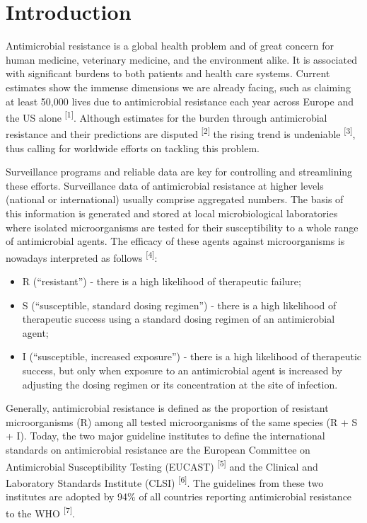 \documentclass[
]{book}
\providecommand{\tightlist}{%
  \setlength{\itemsep}{0pt}\setlength{\parskip}{0pt}}
\begin{document}
\hypertarget{introduction-1}{%
\section{Introduction}\label{introduction-1}}

Antimicrobial resistance is a global health problem and of great concern for human medicine, veterinary medicine, and the environment alike. It is associated with significant burdens to both patients and health care systems. Current estimates show the immense dimensions we are already facing, such as claiming at least 50,000 lives due to antimicrobial resistance each year across Europe and the US alone \textsuperscript{{[}1{]}}. Although estimates for the burden through antimicrobial resistance and their predictions are disputed \textsuperscript{{[}2{]}} the rising trend is undeniable \textsuperscript{{[}3{]}}, thus calling for worldwide efforts on tackling this problem.

Surveillance programs and reliable data are key for controlling and streamlining these efforts. Surveillance data of antimicrobial resistance at higher levels (national or international) usually comprise aggregated numbers. The basis of this information is generated and stored at local microbiological laboratories where isolated microorganisms are tested for their susceptibility to a whole range of antimicrobial agents. The efficacy of these agents against microorganisms is nowadays interpreted as follows \textsuperscript{{[}4{]}}:

\begin{itemize}
\tightlist
\item
  R (``resistant'') - there is a high likelihood of therapeutic failure;
\item
  S (``susceptible, standard dosing regimen'') - there is a high likelihood of therapeutic success using a standard dosing regimen of an antimicrobial agent;
\item
  I (``susceptible, increased exposure'') - there is a high likelihood of therapeutic success, but only when exposure to an antimicrobial agent is increased by adjusting the dosing regimen or its concentration at the site of infection.
\end{itemize}

Generally, antimicrobial resistance is defined as the proportion of resistant microorganisms (R) among all tested microorganisms of the same species (R + S + I). Today, the two major guideline institutes to define the international standards on antimicrobial resistance are the European Committee on Antimicrobial Susceptibility Testing (EUCAST) \textsuperscript{{[}5{]}} and the Clinical and Laboratory Standards Institute (CLSI) \textsuperscript{{[}6{]}}. The guidelines from these two institutes are adopted by 94\% of all countries reporting antimicrobial resistance to the WHO \textsuperscript{{[}7{]}}.
\end{document}
